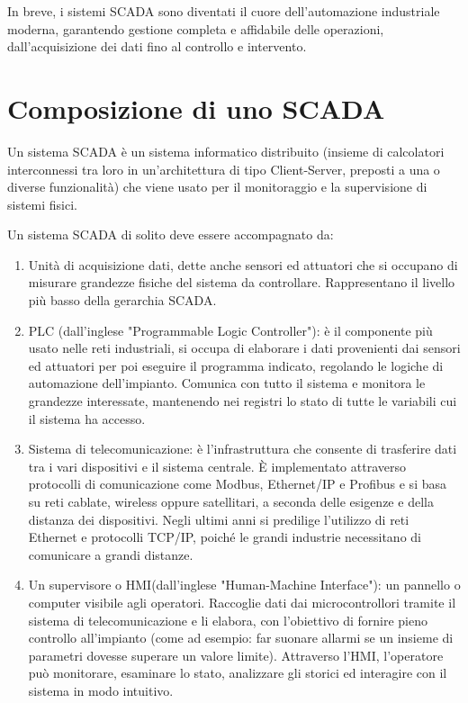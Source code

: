 In breve, i sistemi SCADA sono diventati il cuore dell'automazione industriale moderna, garantendo gestione completa e affidabile delle operazioni, dall'acquisizione dei dati fino al controllo e intervento.

\section{Composizione di uno SCADA}
Un sistema SCADA è un sistema informatico distribuito (insieme di calcolatori interconnessi tra loro in un'architettura di tipo Client-Server, preposti a una o diverse funzionalità) che viene usato per il monitoraggio e la supervisione di sistemi fisici.

Un sistema SCADA di solito deve essere accompagnato da:
\begin{enumerate}
    \item Unità di acquisizione dati, dette anche sensori ed attuatori che si occupano di misurare grandezze fisiche del sistema da controllare. Rappresentano il livello più basso della gerarchia SCADA.
    \item PLC (dall'inglese "Programmable Logic Controller"): è il componente più usato nelle reti industriali, si occupa di elaborare i dati provenienti dai sensori ed attuatori per poi eseguire il programma indicato, regolando le logiche di automazione dell'impianto. Comunica con tutto il sistema e monitora le grandezze interessate, mantenendo nei registri lo stato di tutte le variabili cui il sistema ha accesso.
    \item Sistema di telecomunicazione: è l'infrastruttura che consente di trasferire dati tra i vari dispositivi e il sistema centrale. È implementato attraverso protocolli di comunicazione come Modbus, Ethernet/IP e Profibus e si basa su reti cablate, wireless oppure satellitari, a seconda delle esigenze e della distanza dei dispositivi. Negli ultimi anni si predilige l'utilizzo di reti Ethernet e protocolli TCP/IP, poiché le grandi industrie necessitano di comunicare a grandi distanze.
    \item Un supervisore o HMI(dall'inglese "Human-Machine Interface"): un pannello o computer visibile agli operatori. Raccoglie dati dai microcontrollori tramite il sistema di telecomunicazione e li elabora, con l'obiettivo di fornire pieno controllo all'impianto (come ad esempio: far suonare allarmi se un insieme di parametri dovesse superare un valore limite). Attraverso l'HMI, l'operatore può monitorare, esaminare lo stato, analizzare gli storici ed interagire con il sistema in modo intuitivo.
\end{enumerate}
